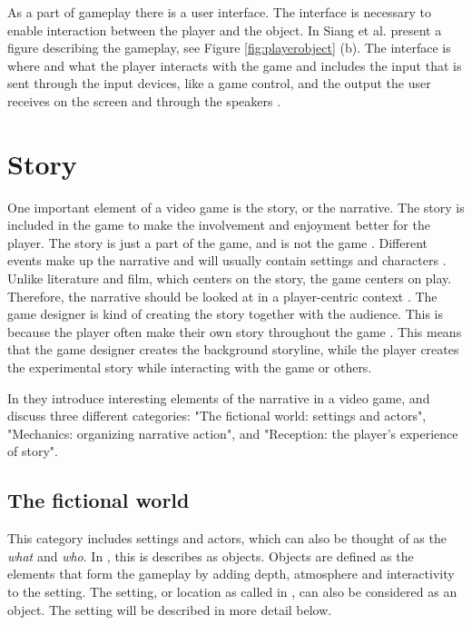 As a part of gameplay there is a user interface. The interface is necessary to enable interaction between the player and the object. In \cite{umlapproach} Siang et al. present a figure describing the gameplay, see Figure \ref{fig:playerobject} (b). The interface is where and what the player interacts with the game and includes the input that is sent through the input devices, like a game control, and the output the user receives on the screen and through the speakers \cite{umlapproach}.

\section{Story}
One important element of a video game is the story, or the narrative. The story is included in the game to make the involvement and enjoyment better for the player. The story is just a part of the game, and is not the game \cite{umlapproach}.  Different events make up the narrative and will usually contain settings and characters \cite{understandingvg}. Unlike literature and film, which centers on the story, the game centers on play. Therefore, the narrative should be looked at in a player-centric context \cite{gametheory}. The game designer is kind of creating the story together with the audience. This is because the player often make their own story throughout the game \cite{umlapproach}. This means that the game designer creates the background storyline, while the player creates the experimental story while interacting with the game or others. 

In \cite{understandingvg} they introduce interesting elements of the narrative in a video game, and discuss three different categories: "The fictional world: settings and actors", "Mechanics: organizing narrative action", and "Reception: the player's experience of story".

\subsection{The fictional world}
This category includes settings and actors, which can also be thought of as the \emph{what} and \emph{who}. In \cite{beram}, this is describes as objects. Objects are defined as the elements that form the gameplay by adding depth, atmosphere and interactivity to the setting. The setting, or location as called in \cite{beram}, can also be considered as an object. The setting will be described in more detail below.

